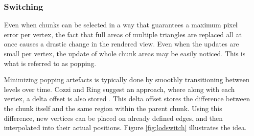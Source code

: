 \subsubsection{Switching}
Even when chunks can be selected in a way that guarantees a maximum pixel error per vertex, the fact that full areas of multiple triangles are replaced all at once causes a drastic change in the rendered view. Even when the updates are small per vertex, the update of whole chunk areas may be easily noticed. This is what is referred to as popping.

Minimizing popping artefacts is typically done by smoothly transitioning between levels over time. Cozzi and Ring suggest an approach, where along with each vertex, a delta offset is also stored \cite[p. 451]{cozzi11}. This delta offset stores the difference between the chunk itself and the same region within the parent chunk. Using this difference, new vertices can be placed on already defined edges, and then interpolated into their actual positions. Figure \ref{fig:lodswitch} illustrates the idea.

